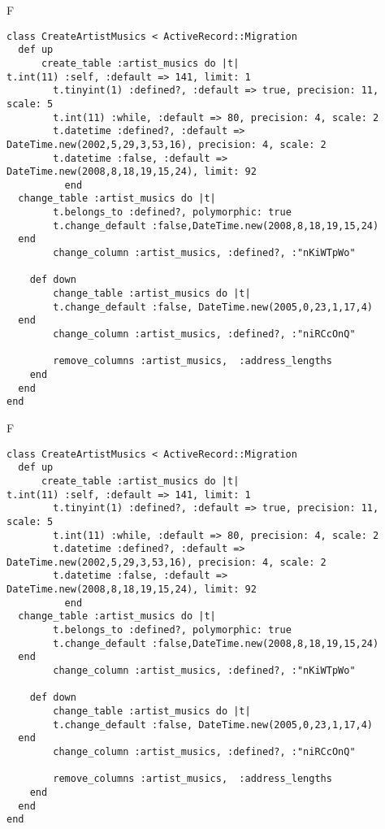 F
\begin{verbatim}
class CreateArtistMusics < ActiveRecord::Migration
  def up
	  create_table :artist_musics do |t|
t.int(11) :self, :default => 141, limit: 1
		t.tinyint(1) :defined?, :default => true, precision: 11, scale: 5
		t.int(11) :while, :default => 80, precision: 4, scale: 2
		t.datetime :defined?, :default => DateTime.new(2002,5,29,3,53,16), precision: 4, scale: 2
		t.datetime :false, :default => DateTime.new(2008,8,18,19,15,24), limit: 92
		  end
  change_table :artist_musics do |t|
		t.belongs_to :defined?, polymorphic: true
 		t.change_default :false,DateTime.new(2008,8,18,19,15,24)
  end
 		change_column :artist_musics, :defined?, :"nKiWTpWo"
   
	def down
		change_table :artist_musics do |t|
		t.change_default :false, DateTime.new(2005,0,23,1,17,4)
  end
 		change_column :artist_musics, :defined?, :"niRCcOnQ"
   
		remove_columns :artist_musics,  :address_lengths 
    end 
  end
end

\end{verbatim}

F
\begin{verbatim}
class CreateArtistMusics < ActiveRecord::Migration
  def up
	  create_table :artist_musics do |t|
t.int(11) :self, :default => 141, limit: 1
		t.tinyint(1) :defined?, :default => true, precision: 11, scale: 5
		t.int(11) :while, :default => 80, precision: 4, scale: 2
		t.datetime :defined?, :default => DateTime.new(2002,5,29,3,53,16), precision: 4, scale: 2
		t.datetime :false, :default => DateTime.new(2008,8,18,19,15,24), limit: 92
		  end
  change_table :artist_musics do |t|
		t.belongs_to :defined?, polymorphic: true
 		t.change_default :false,DateTime.new(2008,8,18,19,15,24)
  end
 		change_column :artist_musics, :defined?, :"nKiWTpWo"
   
	def down
		change_table :artist_musics do |t|
		t.change_default :false, DateTime.new(2005,0,23,1,17,4)
  end
 		change_column :artist_musics, :defined?, :"niRCcOnQ"
   
		remove_columns :artist_musics,  :address_lengths 
    end 
  end
end

\end{verbatim}

